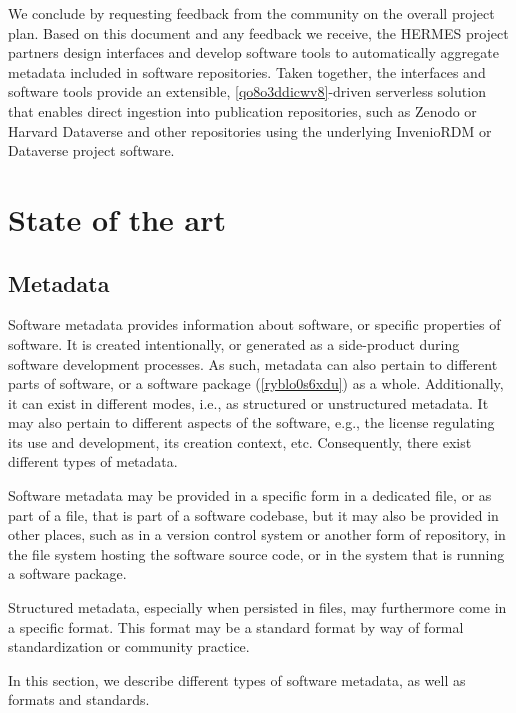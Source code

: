 \documentclass{article}
\begin{document}
We conclude by requesting feedback from the community on the overall project plan. Based on this document and any feedback we receive, the HERMES project partners design interfaces and develop software tools to automatically aggregate metadata included in software repositories. Taken together, the interfaces and software tools provide an extensible, \ref{qo8o3ddicwv8}-driven serverless solution that enables direct ingestion into publication repositories, such as Zenodo or Harvard Dataverse and other repositories using the underlying InvenioRDM or Dataverse project software. 



\section{State of the art}\label{sec:state-of-the-art}


\subsection{Metadata}\label{sec:metadata}
Software metadata provides information about software, or specific properties of software. It is created intentionally, or generated as a side-product during software development processes. As such, metadata can also pertain to different parts of software, or a software package (\ref{ryblo0s6xdu}) as a whole. Additionally, it can exist in different modes, i.e., as structured or unstructured metadata. It may also pertain to different aspects of the software, e.g., the license regulating its use and development, its creation context, etc. Consequently, there exist different types of metadata.

Software metadata may be provided in a specific form in a dedicated file, or as part of a file, that is part of a software codebase, but it may also be provided in other places, such as in a version control system or another form of repository, in the file system hosting the software source code, or in the system that is running a software package.  

Structured metadata, especially when persisted in files, may furthermore come in a specific format. This format may be a standard format by way of formal standardization or community practice.

In this section, we describe different types of software metadata, as well as formats and standards.
\end{document}
